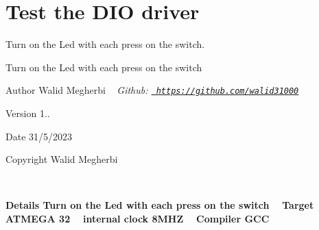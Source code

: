 \chapter{Test the DIO driver}
\hypertarget{index}{}\label{index}
Turn on the Led with each press on the switch.

Turn on the Led with each press on the switch 
   

\begin{DoxyAuthor}{Author}
Walid Megherbi ~\newline
 {\itshape  Github\+: \href{https://github.com/walid31000}{\texttt{ https\+://github.\+com/walid31000}} } 
\end{DoxyAuthor}
\begin{DoxyVersion}{Version}
1.. 
\end{DoxyVersion}
\begin{DoxyDate}{Date}
31/5/2023 
\end{DoxyDate}
\begin{DoxyCopyright}{Copyright}
Walid Megherbi
\end{DoxyCopyright}
 ~\newline


{\bfseries{ Details }} {\bfseries{ Turn on the Led with each press on the switch ~\newline
 {\bfseries{ Target }} ATMEGA 32 ~\newline
 {\bfseries{ internal clock }} 8MHZ ~\newline
 {\bfseries{ Compiler }} GCC }}
